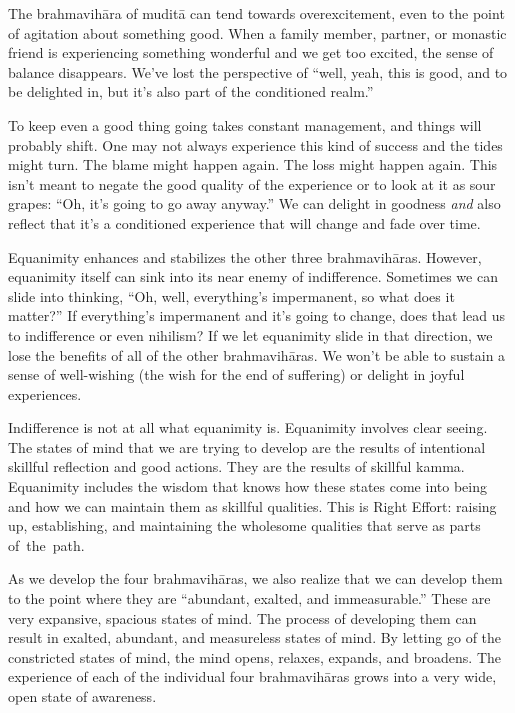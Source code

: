 The brahmavihāra of muditā can tend towards overexcitement, even to the point of agitation about something good. When a family member, partner, or monastic friend is experiencing something wonderful and we get too excited, the sense of balance disappears. We've lost the perspective of ``well, yeah, this is good, and to be delighted in, but it's also part of the conditioned realm.''

To keep even a good thing going takes constant management, and things will probably shift. One may not always experience this kind of success and the tides might turn. The blame might happen again. The loss might happen again. This isn't meant to negate the good quality of the experience or to look at it as sour grapes: ``Oh, it's going to go away anyway.'' We can delight in goodness \emph{and} also reflect that it's a conditioned experience that will change and fade over time.

Equanimity enhances and stabilizes the other three brahmavihāras. However, equanimity itself can sink into its near enemy of indifference. Sometimes we can slide into thinking, ``Oh, well, everything's impermanent, so what does it matter?'' If everything's impermanent and it's going to change, does that lead us to indifference or even nihilism? If we let equanimity slide in that direction, we lose the benefits of all of the other brahmavihāras. We won't be able to sustain a sense of well-wishing (the wish for the end of suffering) or delight in joyful experiences.

Indifference is not at all what equanimity is. Equanimity involves clear seeing. The states of mind that we are trying to develop are the results of intentional skillful reflection and good actions. They are the results of skillful kamma. Equanimity includes the wisdom that knows how these states come into being and how we can maintain them as skillful qualities. This is Right Effort: raising up, establishing, and maintaining the wholesome qualities that serve as parts \mbox{of the path.}

As we develop the four brahmavihāras, we also realize that we can develop them to the point where they are ``abundant, exalted, and immeasurable.'' These are very expansive, spacious states of mind. The process of developing them can result in exalted, abundant, and measureless states of mind. By letting go of the constricted states of mind, the mind opens, relaxes, expands, and broadens. The experience of each of the individual four brahmavihāras grows into a very wide, open state of awareness.

